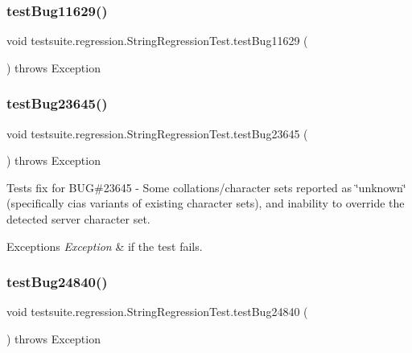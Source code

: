 \subsubsection{\texorpdfstring{test\+Bug11629()}{testBug11629()}}
{\footnotesize\ttfamily void testsuite.\+regression.\+String\+Regression\+Test.\+test\+Bug11629 (\begin{DoxyParamCaption}{ }\end{DoxyParamCaption}) throws Exception}

\mbox{\label{classtestsuite_1_1regression_1_1_string_regression_test_a0b910fb41d304e6b938f8908dfffe0bf}} 
\subsubsection{\texorpdfstring{test\+Bug23645()}{testBug23645()}}
{\footnotesize\ttfamily void testsuite.\+regression.\+String\+Regression\+Test.\+test\+Bug23645 (\begin{DoxyParamCaption}{ }\end{DoxyParamCaption}) throws Exception}

Tests fix for B\+UG\#23645 -\/ Some collations/character sets reported as \char`\"{}unknown\char`\"{} (specifically cias variants of existing character sets), and inability to override the detected server character set.


\begin{DoxyExceptions}{Exceptions}
{\em Exception} & if the test fails. \\
\hline
\end{DoxyExceptions}
\mbox{\label{classtestsuite_1_1regression_1_1_string_regression_test_a64fc08a013f1e23f5fcaaeecb3681aa5}} 
\subsubsection{\texorpdfstring{test\+Bug24840()}{testBug24840()}}
{\footnotesize\ttfamily void testsuite.\+regression.\+String\+Regression\+Test.\+test\+Bug24840 (\begin{DoxyParamCaption}{ }\end{DoxyParamCaption}) throws Exception}

